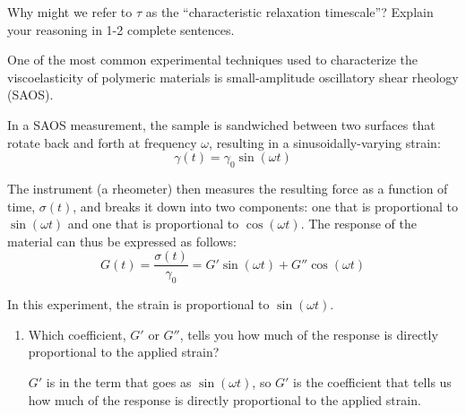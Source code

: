\begin{activity}
\begin{ctqs}
		\question Why might we refer to $\tau$ as the ``characteristic relaxation timescale''?  Explain your reasoning in 1-2 complete sentences.
	
					\begin{solution}[1.5in]
					\end{solution}
		
\end{ctqs}

\begin{model}
\label{model:rheology}

	One of the most common experimental techniques used to characterize the viscoelasticity of polymeric materials is small-amplitude oscillatory shear rheology (SAOS).
	
	In a SAOS measurement, the sample is sandwiched between two surfaces that rotate back and forth at frequency $\omega$, resulting in a sinusoidally-varying strain:
	\begin{equation*}
		\gamma(t) = \gamma_0 \sin(\omega t)
	\end{equation*}
	
	The instrument (a rheometer) then measures the resulting force as a function of time, $\sigma(t)$, and breaks it down into two components: one that is proportional to $\sin(\omega t)$ and one that is proportional to $\cos(\omega t)$. The response of the material can thus be expressed as follows:
	\begin{equation*}
		G(t) = \frac{\sigma(t)}{\gamma_0} = G' \sin(\omega t) + G'' \cos(\omega t)
	\end{equation*}

\end{model}

\begin{ctqs}
		
		\question In this experiment, the strain is proportional to $\sin(\omega t)$.  
			\begin{enumerate}
				\item Which coefficient, $G'$ or $G''$, tells you how much of the response is directly proportional to the applied strain?
	
					\begin{solution}[1in]
						$G'$ is in the term that goes as $\sin(\omega t)$, so $G'$ is the coefficient that tells us how much of the response is directly proportional to the applied strain.
					\end{solution}
		

\end{enumerate}
\end{ctqs}
\end{activity}
